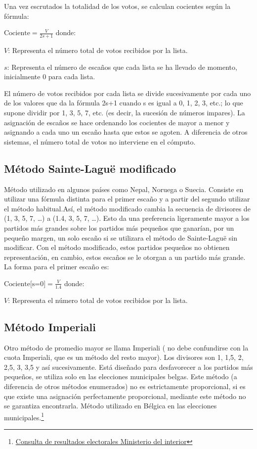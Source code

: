 \documentclass[12pt,a4paper,]{book}
\let\rmarkdownfootnote\footnote%
\def\footnote{\protect\rmarkdownfootnote}
\numberwithin{dummy}{section}
\theoremstyle{ocrenumbox}
\theoremstyle{blacknumex}
\theoremstyle{blacknumbox}
\theoremstyle{ocrenum}
\theoremstyle{ocrenum}
\begin{document}
Una vez escrutados la totalidad de los votos, se calculan cocientes
según la fórmula:

\(\textrm{Cociente} = \frac{V}{2s+1}\) donde:

\(V\): Representa el número total de votos recibidos por la lista.

\(s\): Representa el número de escaños que cada lista se ha llevado de
momento, inicialmente 0 para cada lista.

El número de votos recibidos por cada lista se divide sucesivamente por
cada uno de los valores que da la fórmula 2s+1 cuando s es igual a 0, 1,
2, 3, etc.; lo que supone dividir por 1, 3, 5, 7, etc. (es decir, la
sucesión de números impares). La asignación de escaños se hace ordenando
los cocientes de mayor a menor y asignando a cada uno un escaño hasta
que estos se agoten. A diferencia de otros sistemas, el número total de
votos no interviene en el cómputo.

\hypertarget{muxe9todo-sainte-laguuxeb-modificado}{%
\subsection{Método Sainte-Laguë
modificado}\label{muxe9todo-sainte-laguuxeb-modificado}}

Método utilizado en algunos países como Nepal, Noruega o Suecia.
Consiste en utilizar una fórmula distinta para el primer escaño y a
partir del segundo utilizar el método habitual.Así, el método modificado
cambia la secuencia de divisores de (1, 3, 5, 7, \ldots) a (1.4, 3, 5,
7, \ldots). Esto da una preferencia ligeramente mayor a los partidos más
grandes sobre los partidos más pequeños que ganarían, por un pequeño
margen, un solo escaño si se utilizara el método de Sainte-Laguë sin
modificar. Con el método modificado, estos partidos pequeños no obtienen
representación, en cambio, estos escaños se le otorgan a un partido más
grande. La forma para el primer escaño es:

\(\textrm{Cociente[s=0]} = \frac{V}{1.4}\) donde:

\(V\): Representa el número total de votos recibidos por la lista.

\hypertarget{muxe9todo-imperiali}{%
\subsection{Método Imperiali}\label{muxe9todo-imperiali}}

Otro método de promedio mayor se llama Imperiali ( no debe confundirse
con la cuota Imperiali, que es un método del resto mayor). Los divisores
son 1, 1,5, 2, 2,5, 3, 3,5 y así sucesivamente. Está diseñado para
desfavorecer a los partidos más pequeños, se utiliza solo en las
elecciones municipales belgas. Este método (a diferencia de otros
métodos enumerados) no es estrictamente proporcional, si es que existe
una asignación perfectamente proporcional, mediante este método no se
garantiza encontrarla. Método utilizado en Bélgica en las elecciones
municipales.\footnote{\href{http://www.infoelectoral.mir.es/min/}{Consulta
  de resultados electorales Ministerio del interior}}
\end{document}
